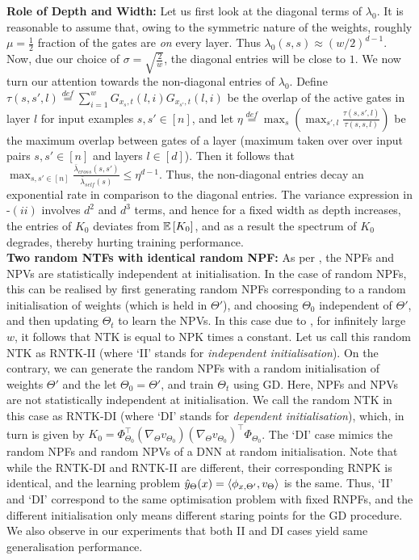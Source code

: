 \textbf{Role of Depth and Width:} Let us first look at the diagonal terms of $\lambda_0$. It is reasonable to assume that, owing to the symmetric nature of the weights, roughly $\mu=\frac{1}{2}$ fraction of the gates are \emph{on} every layer. Thus $\lambda_0(s,s)\approx (w/2)^{d-1}$. Now, due our choice of $\sigma=\sqrt{\frac{2}{w}}$, the diagonal entries will be close to $1$. We now turn our attention towards the non-diagonal entries of $\lambda_0$. Define $\tau(s,s',l)\stackrel{def}=\sum_{i=1}^w G_{x_s,t}(l,i)G_{x_{s'},t}(l,i)$ be the overlap of the active gates in layer $l$ for input examples $s,s'\in[n]$, and  let $\eta\stackrel{def}=\max_s\left(\max_{s',l} \frac{\tau(s,s',l)}{\tau(s,s,l)}\right)$ be the maximum overlap between gates of a layer (maximum taken over over input pairs $s,s'\in[n]$ and layers $l\in [d]$).  Then it follows that $\max_{s,s'\in [n]} \frac{\bar{\lambda}_{cross}(s,s')}{\bar{\lambda}_{self}(s)}\leq \eta^{d-1}$. Thus, the non-diagonal entries decay an exponential rate in comparison to the diagonal entries. The variance expression in -$(ii)$ involves $d^2$ and $d^3$ terms, and hence for a fixed width as depth increases, the entries of $K_0$ deviates from $\mathbb{E}\left[K_0\right]$, and as a result the spectrum of $K_0$ degrades, thereby hurting training performance.\\
\textbf{Two random NTFs with identical random NPF:} As per , the NPFs and NPVs are statistically independent at initialisation. In the case of random NPFs, this can be realised by first generating random NPFs corresponding to a random initialisation of weights (which is held in $\Theta'$), and  choosing $\Theta_0$ independent of $\Theta'$, and then updating $\Theta_t$ to learn the NPVs. In this case due to , for infinitely large $w$, it follows that NTK is equal to NPK times a constant. Let us call this random NTK as RNTK-II (where `II' stands for \emph{independent initialisation}). On the contrary, we can generate the random NPFs with a random initialisation of weights $\Theta'$ and the let $\Theta_0=\Theta'$, and train $\Theta_t$ using GD. Here, NPFs and NPVs are not statistically independent at initialisation. We call the random NTK in this case as RNTK-DI (where `DI' stands for \emph{dependent initialisation}), which, in turn is given by $K_0=\Phi^\top_{\Theta_0}(\nabla_{\Theta} v_{\Theta_0})(\nabla_{\Theta} v_{\Theta_0})^\top \Phi_{\Theta_0}$. The `DI' case mimics the random NPFs and random NPVs of a DNN at random initialisation. Note that while the RNTK-DI and RNTK-II are different, their corresponding RNPK is identical, and the learning problem $\hat{y}_{\Theta}(x)=\langle \phi_{x,\Theta'},v_{\Theta}\rangle$ is the same. Thus, `II' and `DI' correspond to the same optimisation problem with fixed RNPFs, and the different initialisation only means different staring points for the GD procedure.  We also observe in our experiments that both II and DI cases yield same generalisation performance. 

